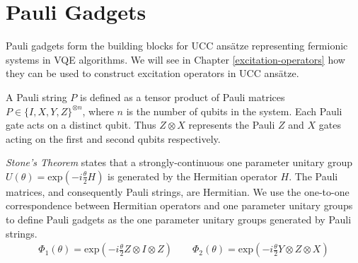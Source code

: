 \chapter{Pauli Gadgets}%
\label{pauli-gadgets}

Pauli gadgets form the building blocks for UCC ansätze representing fermionic systems in VQE algorithms. We will see in Chapter \ref{excitation-operators} how they can be used to construct excitation operators in UCC ansätze.

A Pauli string $P$ is defined as a tensor product of Pauli matrices $P \in \{I, X, Y, Z\}^{\otimes n}$, where $n$ is the number of qubits in the system. Each Pauli gate acts on a distinct qubit. Thus $Z \otimes X$ represents the Pauli $Z$ and $X$ gates acting on the first and second qubits respectively.

\textit{Stone's Theorem} \cite{Stone1932} states that a strongly-continuous one parameter unitary group $U(\theta) = \text{exp} \left(- i \frac{\theta}{2} H \right)$ is generated by the Hermitian operator $H$. The Pauli matrices, and consequently Pauli strings, are Hermitian. We use the one-to-one correspondence between Hermitian operators and one parameter unitary groups to define Pauli gadgets as the one parameter unitary groups generated by Pauli strings.
\begin{gather*}
    \Phi_1(\theta) = \text{exp}\left(- i \frac{\theta}{2} Z \otimes I \otimes Z \right) \qquad
    \Phi_2(\theta) = \text{exp}\left(- i \frac{\theta}{2} Y \otimes Z \otimes X \right)%
\end{gather*}

